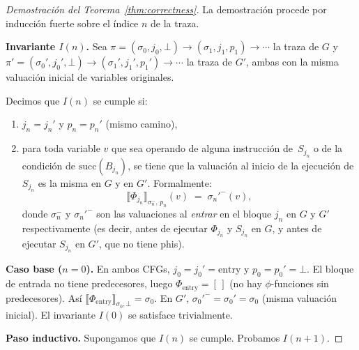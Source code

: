 \documentclass[12pt, a4paper]{article}
\begin{document}
\begin{proof}[Demostración del Teorema~\ref{thm:correctness}]
La demostración procede por inducción fuerte sobre el índice $n$ de la traza.

\medskip
\textbf{Invariante $I(n)$.} Sea
$\pi = (\sigma_0, j_0, \bot) \to (\sigma_1, j_1, p_1) \to \cdots$
la traza de $G$ y
$\pi' = (\sigma_0', j_0', \bot) \to (\sigma_1', j_1', p_1') \to \cdots$
la traza de $G'$, ambas con la misma valuación inicial de variables originales.

Decimos que $I(n)$ se cumple si:
\begin{enumerate}
  \item[\textbf{(I1)}] $j_n = j_n'$ y $p_n = p_n'$ \quad (mismo camino),
  \item[\textbf{(I2)}] para toda variable $v$ que sea operando de alguna instrucción
    de~$S_{j_n}$ o de la condición de $\mathrm{succ}(B_{j_n})$, se tiene que la valuación al
    inicio de la ejecución de $S_{j_n}$ es la misma en $G$ y en $G'$. Formalmente:
    \[
      \llbracket \Phi_{j_n} \rrbracket_{\sigma_n^-,\, p_n}(v)
      \;=\; \sigma_n'^{-}(v),
    \]
    donde $\sigma_n^-$ y $\sigma_n'^{-}$ son las valuaciones al \emph{entrar} en el bloque
    $j_n$ en $G$ y $G'$ respectivamente (es decir, antes de ejecutar $\Phi_{j_n}$ y $S_{j_n}$
    en $G$, y antes de ejecutar $S_{j_n}$ en $G'$, que no tiene phis).
\end{enumerate}

\medskip
\textbf{Caso base ($n = 0$).}
En ambos CFGs, $j_0 = j_0' = \mathrm{entry}$ y $p_0 = p_0' = \bot$.
El bloque de entrada no tiene predecesores, luego $\Phi_{\mathrm{entry}} = [\,]$
(no hay $\phi$-funciones sin predecesores). Así
$\llbracket \Phi_{\mathrm{entry}} \rrbracket_{\sigma_0, \bot} = \sigma_0$.
En $G'$, $\sigma_0'^{-} = \sigma_0' = \sigma_0$ (misma valuación inicial).
El invariante $I(0)$ se satisface trivialmente.

\medskip
%
\textbf{Paso inductivo.} Supongamos que $I(n)$ se cumple. Probamos $I(n+1)$.


\end{proof}
\end{document}
